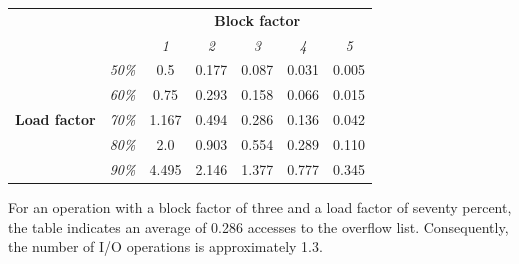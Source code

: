 \begin{table}[H]
    \centering
    \begin{tabular}{ccccccc}
                                                               & \textit{}                         & \multicolumn{5}{c}{\textbf{Block factor}}                                                                                                                               \\ \cline{3-7} 
    \textit{}                                                  & \multicolumn{1}{c|}{}             & \multicolumn{1}{c|}{\textit{1}} & \multicolumn{1}{c|}{\textit{2}} & \multicolumn{1}{c|}{\textit{3}} & \multicolumn{1}{c|}{\textit{4}} & \multicolumn{1}{c|}{\textit{5}} \\ \cline{2-7} 
    \multicolumn{1}{c|}{\multirow{5}{*}{\textbf{Load factor}}} & \multicolumn{1}{c|}{\textit{50\%}} & \multicolumn{1}{c|}{0.5}        & \multicolumn{1}{c|}{0.177}      & \multicolumn{1}{c|}{0.087}      & \multicolumn{1}{c|}{0.031}      & \multicolumn{1}{c|}{0.005}      \\ \cline{2-7} 
    \multicolumn{1}{c|}{}                                      & \multicolumn{1}{c|}{\textit{60\%}} & \multicolumn{1}{c|}{0.75}       & \multicolumn{1}{c|}{0.293}      & \multicolumn{1}{c|}{0.158}      & \multicolumn{1}{c|}{0.066}      & \multicolumn{1}{c|}{0.015}      \\ \cline{2-7} 
    \multicolumn{1}{c|}{}                                      & \multicolumn{1}{c|}{\textit{70\%}} & \multicolumn{1}{c|}{1.167}      & \multicolumn{1}{c|}{0.494}      & \multicolumn{1}{c|}{0.286}      & \multicolumn{1}{c|}{0.136}      & \multicolumn{1}{c|}{0.042}      \\ \cline{2-7} 
    \multicolumn{1}{c|}{}                                      & \multicolumn{1}{c|}{\textit{80\%}} & \multicolumn{1}{c|}{2.0}        & \multicolumn{1}{c|}{0.903}      & \multicolumn{1}{c|}{0.554}      & \multicolumn{1}{c|}{0.289}      & \multicolumn{1}{c|}{0.110}      \\ \cline{2-7} 
    \multicolumn{1}{c|}{}                                      & \multicolumn{1}{c|}{\textit{90\%}} & \multicolumn{1}{c|}{4.495}      & \multicolumn{1}{c|}{2.146}      & \multicolumn{1}{c|}{1.377}      & \multicolumn{1}{c|}{0.777}      & \multicolumn{1}{c|}{0.345}      \\ \cline{2-7} 
    \end{tabular}
\end{table}
\begin{example}
    For an operation with a block factor of three and a load factor of seventy percent, the table indicates an average of 0.286 accesses to the overflow list. 
    Consequently, the number of I/O operations is approximately 1.3.
\end{example} 

